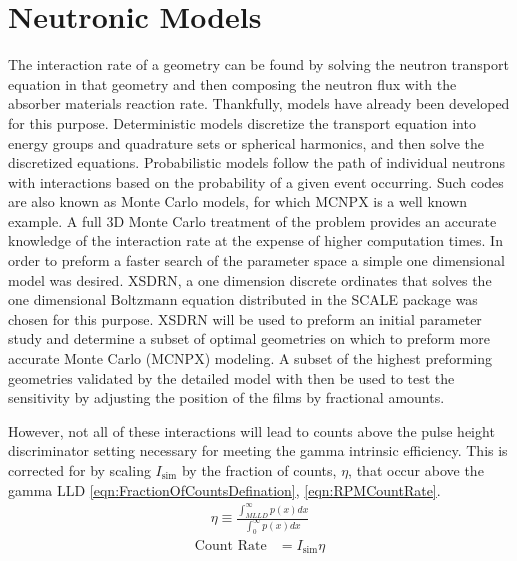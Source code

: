 \section{Neutronic Models}
The interaction rate of a geometry can be found by solving the neutron transport equation in that geometry and then composing the neutron flux with the absorber materials reaction rate.
Thankfully, models have already been developed for this purpose.
Deterministic models discretize the transport equation into energy groups and quadrature sets or spherical harmonics, and then solve the discretized equations.
Probabilistic models follow the path of individual neutrons with interactions based on the probability of a given event occurring.
Such codes are also known as Monte Carlo models, for which MCNPX is a well known example.
A full 3D Monte Carlo treatment of the problem provides an accurate knowledge of the interaction rate at the expense of higher computation times. 
In order to preform a faster search of the parameter space a simple one dimensional model was desired.
XSDRN, a one dimension discrete ordinates that solves the one dimensional Boltzmann equation distributed in the SCALE package was chosen for this purpose.
XSDRN will be used to preform an initial parameter study and determine a subset of optimal geometries on which to preform more accurate Monte Carlo (MCNPX) modeling. 
A subset of the highest preforming geometries validated by the detailed model with then be used to test the sensitivity by adjusting the position of the films by fractional amounts.



However, not all of these interactions will lead to counts above the pulse height discriminator setting necessary for meeting the gamma intrinsic efficiency.
This is corrected for by scaling $I_{\text{sim}}$ by the fraction of counts, $\eta$, that occur above the gamma LLD \eqref{eqn:FractionOfCountsDefination}, \eqref{eqn:RPMCountRate}.
\begin{align}
  \label{eqn:FractionOfCountsDefination}
  \eta \equiv \frac{\int_{MLLD}^\infty p(x)dx}{\int_0^\infty p(x)dx}
\end{align}
\begin{align}
 \label{eqn:RPMCountRate}
 \text{Count Rate} &= I_{\text{sim}} \eta
\end{align}


